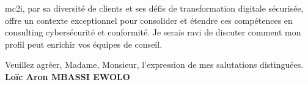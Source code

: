 \documentclass[a4paper,11pt]{article}
\begin{document}
\vspace{0.8em}
\noindent mc2i, par sa diversité de clients et ses défis de transformation digitale sécurisée, offre un contexte exceptionnel pour consolider et étendre ces compétences en consulting cybersécurité et conformité. Je serais ravi de discuter comment mon profil peut enrichir vos équipes de conseil.

\vspace{1.5em}
\noindent Veuillez agr\'eer, Madame, Monsieur, l'expression de mes salutations distingu\'ees.
\vspace{2em}
\noindent \textbf{Lo\"ic Aron MBASSI EWOLO}
\end{document}
